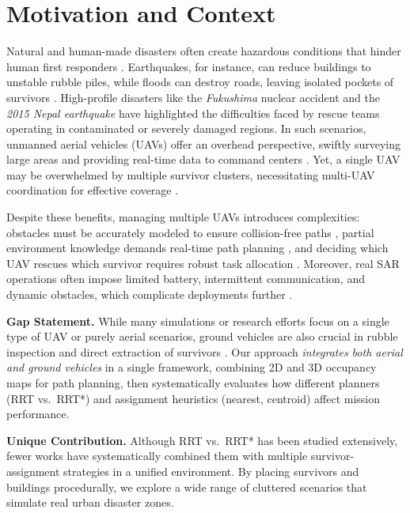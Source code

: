 \documentclass[12pt,a4paper]{report}
\begin{document}
\section{Motivation and Context}
\label{sec:motivation}
Natural and human-made disasters often create hazardous conditions that hinder human
first responders \cite{Auclair2021CollapseRisk,Daud2022DroneDisaster,Erdelj2017MultiUAV}. Earthquakes, for instance, can reduce buildings
to unstable rubble piles, while floods can destroy roads, leaving isolated pockets
of survivors \cite{Daud2022DroneDisaster}. High-profile disasters like the \emph{Fukushima} nuclear accident \cite{UNDRR2015Fukushima}
and the \emph{2015 Nepal earthquake} \cite{Murphy2016DisasterRoboticsNepal} have highlighted the 
difficulties faced by rescue teams operating in contaminated or severely damaged regions. 
In such scenarios, unmanned aerial vehicles (UAVs) offer an overhead perspective, 
swiftly surveying large areas and providing real-time data to command centers \cite{Merei2025UAVObstacleSurvey}. 
Yet, a single UAV may be overwhelmed by multiple survivor clusters, necessitating multi-UAV 
coordination for effective coverage \cite{Erdelj2017MultiUAV}.

Despite these benefits, managing multiple UAVs introduces complexities: obstacles
must be accurately modeled to ensure collision-free paths \cite{Merei2025UAVObstacleSurvey}, partial environment
knowledge demands real-time path planning \cite{Oleynikova2018ReplanDynamic,Zhang2024ShrinkingPOMCP}, and deciding which UAV
rescues which survivor requires robust task allocation \cite{Gerkey2004Taxonomy}. Moreover, real SAR 
operations often impose limited battery, intermittent communication, and dynamic obstacles, 
which complicate deployments further \cite{Murphy2014DisasterRobotics}.

\textbf{Gap Statement.} While many simulations or research efforts focus on a single type of 
UAV or purely aerial scenarios, ground vehicles are also crucial in rubble inspection 
and direct extraction of survivors \cite{Erdelj2017MultiUAV,Daud2022DroneDisaster}. Our approach \emph{integrates both aerial and ground 
vehicles} in a single framework, combining 2D and 3D occupancy maps for path planning, 
then systematically evaluates how different planners (RRT vs.\ RRT*) and assignment 
heuristics (nearest, centroid) affect mission performance.

\textbf{Unique Contribution.} Although RRT vs.\ RRT* has been studied extensively, 
fewer works have systematically combined them with multiple survivor-assignment strategies 
in a unified environment. By placing survivors and buildings procedurally, we explore a 
wide range of cluttered scenarios that simulate real urban disaster zones.
\end{document}
